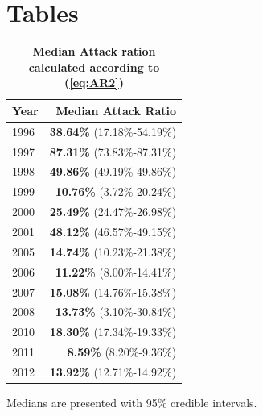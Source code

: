 \section*{Tables}
% 
%
%



\begin{table}[!ht]
\caption{
\bf{Median Attack ration calculated according to (\ref{eq:AR2})}}
\begin{center}
\begin{tabular}{l|r}
\hline
Year & Median Attack Ratio \\
\hline
1996 & \textbf{38.64\%} (17.18\%-54.19\%)\\
1997 & \textbf{87.31\%} (73.83\%-87.31\%)\\
1998 & \textbf{49.86\%} (49.19\%-49.86\%)\\
1999 & \textbf{10.76\%} (3.72\%-20.24\%)\\
2000 & \textbf{25.49\%} (24.47\%-26.98\%)\\
2001 & \textbf{48.12\%} (46.57\%-49.15\%)\\
2005 & \textbf{14.74\%} (10.23\%-21.38\%)\\
2006 & \textbf{11.22\%} (8.00\%-14.41\%)\\
2007 & \textbf{15.08\%} (14.76\%-15.38\%)\\
2008 & \textbf{13.73\%} (3.10\%-30.84\%)\\
2010 & \textbf{18.30\%} (17.34\%-19.33\%)\\
2011 & \textbf{8.59\%} (8.20\%-9.36\%)\\
2012 & \textbf{13.92\%} (12.71\%-14.92\%)\\
\hline
\end{tabular}
\begin{flushleft}Medians are presented with 95\% credible intervals.
\end{flushleft}

\end{center}



\label{tab:AR}
\end{table}

